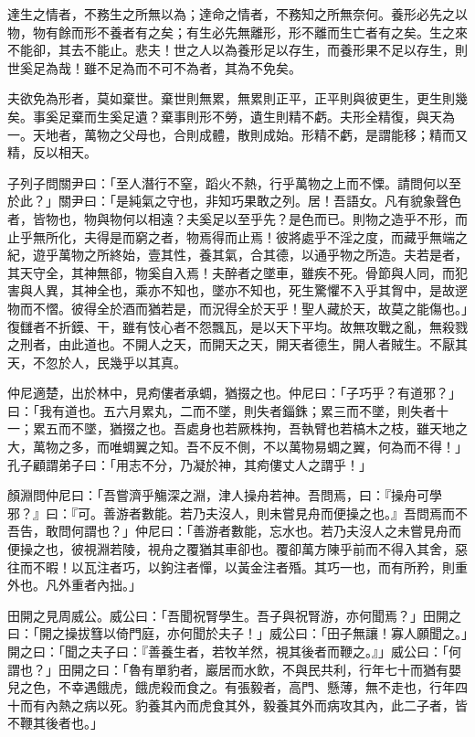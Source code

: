 
\begin{pinyinscope}
達生之情者，不務生之所無以為；達命之情者，不務知之所無奈何。養形必先之以物，物有餘而形不養者有之矣；有生必先無離形，形不離而生亡者有之矣。生之來不能卻，其去不能止。悲夫！世之人以為養形足以存生，而養形果不足以存生，則世奚足為哉！雖不足為而不可不為者，其為不免矣。

夫欲免為形者，莫如棄世。棄世則無累，無累則正平，正平則與彼更生，更生則幾矣。事奚足棄而生奚足遺？棄事則形不勞，遺生則精不虧。夫形全精復，與天為一。天地者，萬物之父母也，合則成體，散則成始。形精不虧，是謂能移；精而又精，反以相天。

子列子問關尹曰：「至人潛行不窒，蹈火不熱，行乎萬物之上而不慄。請問何以至於此？」關尹曰：「是純氣之守也，非知巧果敢之列。居！吾語女。凡有貌象聲色者，皆物也，物與物何以相遠？夫奚足以至乎先？是色而已。則物之造乎不形，而止乎無所化，夫得是而窮之者，物焉得而止焉！彼將處乎不淫之度，而藏乎無端之紀，遊乎萬物之所終始，壹其性，養其氣，合其德，以通乎物之所造。夫若是者，其天守全，其神無郤，物奚自入焉！夫醉者之墜車，雖疾不死。骨節與人同，而犯害與人異，其神全也，乘亦不知也，墜亦不知也，死生驚懼不入乎其胷中，是故遻物而不慴。彼得全於酒而猶若是，而況得全於天乎！聖人藏於天，故莫之能傷也。」復讎者不折鏌、干，雖有忮心者不怨飄瓦，是以天下平均。故無攻戰之亂，無殺戮之刑者，由此道也。不開人之天，而開天之天，開天者德生，開人者賊生。不厭其天，不忽於人，民幾乎以其真。

仲尼適楚，出於林中，見痀僂者承蜩，猶掇之也。仲尼曰：「子巧乎？有道邪？」曰：「我有道也。五六月累丸，二而不墜，則失者錙銖；累三而不墜，則失者十一；累五而不墜，猶掇之也。吾處身也若厥株拘，吾執臂也若槁木之枝，雖天地之大，萬物之多，而唯蜩翼之知。吾不反不側，不以萬物易蜩之翼，何為而不得！」孔子顧謂弟子曰：「用志不分，乃凝於神，其痀僂丈人之謂乎！」

顏淵問仲尼曰：「吾嘗濟乎觴深之淵，津人操舟若神。吾問焉，曰：『操舟可學邪？』曰：『可。善游者數能。若乃夫沒人，則未嘗見舟而便操之也。』吾問焉而不吾告，敢問何謂也？」仲尼曰：「善游者數能，忘水也。若乃夫沒人之未嘗見舟而便操之也，彼視淵若陵，視舟之覆猶其車卻也。覆卻萬方陳乎前而不得入其舍，惡往而不暇！以瓦注者巧，以鉤注者憚，以黃金注者殙。其巧一也，而有所矜，則重外也。凡外重者內拙。」

田開之見周威公。威公曰：「吾聞祝腎學生。吾子與祝腎游，亦何聞焉？」田開之曰：「開之操拔篲以倚門庭，亦何聞於夫子！」威公曰：「田子無讓！寡人願聞之。」開之曰：「聞之夫子曰：『善養生者，若牧羊然，視其後者而鞭之。』」威公曰：「何謂也？」田開之曰：「魯有單豹者，巖居而水飲，不與民共利，行年七十而猶有嬰兒之色，不幸遇餓虎，餓虎殺而食之。有張毅者，高門、懸薄，無不走也，行年四十而有內熱之病以死。豹養其內而虎食其外，毅養其外而病攻其內，此二子者，皆不鞭其後者也。」


\end{pinyinscope}
